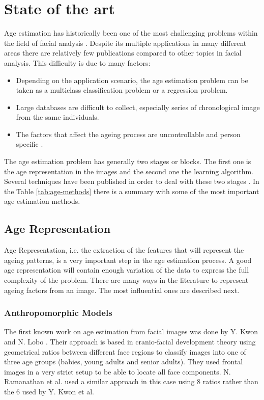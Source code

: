 \chapter{State of the art} \label{chap:sota}

Age estimation has historically been one of the most challenging problems within the field of facial analysis \cite{5406526}\cite{han:age}. Despite its multiple applications in many different areas there are relatively few publications compared to other topics in facial analysis. This difficulty is due to many factors: 
\begin{itemize}
	\item Depending on the application scenario, the age estimation problem can be taken as a multiclass classification problem or a regression problem.
	\item Large databases are difficult to collect, especially series of chronological image from the same individuals.
	\item The factors that affect the ageing process are uncontrollable and person specific \cite{4284917}\cite{4359348}\cite{1709980}.
\end{itemize}

The age estimation problem has generally two stages or blocks. The first one is the age representation in the images and the second one the learning algorithm. Several techniques have been published in order to deal with these two stages \cite{5406526}. In the Table \ref{tab:age-methods} there is a summary with some of the most important age estimation methods.

\section{Age Representation}

Age Representation, i.e. the extraction of the features that will represent the ageing patterns, is a very important step in the age estimation process. A good age representation will contain enough variation of the data to express the full complexity of the problem. There are many ways in the literature to represent ageing factors from an image. The most influential ones are described next.

\subsection{Anthropomorphic Models}
The first known work on age estimation from facial images was done by Y. Kwon and N. Lobo \cite{Kwon:1999:ACF:311844.311845}. Their approach is based in cranio-facial development theory using geometrical ratios between different face regions to classify images into one of three age groups (babies, young adults and senior adults). They used frontal images in a very strict setup to be able to locate all face components. N. Ramanathan et al. \cite{1640784, Ramanathan2009131} used a similar approach in this case using 8 ratios rather than the 6 used by Y. Kwon et al.

